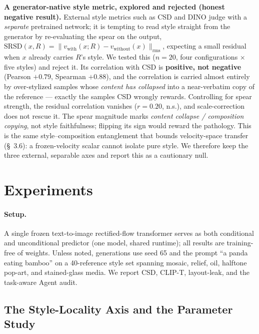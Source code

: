 \documentclass[letterpaper]{article} %
\begin{document}
\textbf{A generator-native style metric, explored and rejected (honest
negative result).} External style metrics such as CSD and DINO
\citep{oquab2024dinov2} judge with a
\emph{separate} pretrained network; it is tempting to read style straight
from the generator by re-evaluating the spear on the output,
$\text{SRSD}(x,R)=\lVert v_{\text{with}}(x;R)-v_{\text{without}}(x)\rVert_{\text{rms}}$,
expecting a small residual when $x$ already carries $R$'s style. We tested
this ($n=20$, four configurations $\times$ five styles) and reject it. Its
correlation with CSD is \textbf{positive, not negative} (Pearson $+0.79$,
Spearman $+0.88$), and the correlation is carried almost entirely by
over-stylized samples whose \emph{content has collapsed} into a
near-verbatim copy of the reference --- exactly the samples CSD wrongly
rewards. Controlling for spear strength, the residual correlation vanishes
($r=0.20$, n.s.), and scale-correction does not rescue it. The spear
magnitude marks \emph{content collapse / composition copying}, not style
faithfulness; flipping its sign would reward the pathology. This is the same
style--composition entanglement that bounds velocity-space transfer (\S~3.6):
a frozen-velocity scalar cannot isolate pure style. We therefore keep the
three external, separable axes and report this as a cautionary null.

\section{Experiments}

\paragraph{Setup.} A single frozen text-to-image rectified-flow transformer
serves as both conditional and unconditional predictor (one model, shared
runtime); all results are training-free of weights. Unless noted, generations
use seed 65 and the prompt ``a panda eating bamboo'' on a 40-reference style
set spanning mosaic, relief, oil, halftone pop-art, and stained-glass media.
We report CSD, CLIP-T, layout-leak, and the task-aware Agent audit.

\subsection{The Style-Locality Axis and the Parameter Study}
\end{document}
